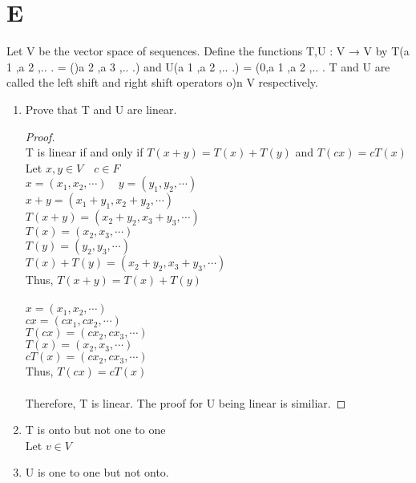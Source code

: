 \documentclass[11pt]{scrartcl}
\begin{document}
\section{E}
Let V be the vector space of sequences. Define the functions T,U : V → V by
T(a 1 ,a 2 ,.. . = ()a 2 ,a 3 ,.. .) and U(a 1 ,a 2 ,.. .) = (0,a 1 ,a 2 ,.. .
T and U are called the left shift and right shift operators o)n V respectively.
\begin{enumerate}[label=\alph*.]
	\item{
		Prove that T and U are linear.
		\begin{proof}
			\-\\
			T is linear if and only if $T(x+y) = T(x) + T(y)$ and $T(cx) = cT(x)$\\	
			Let $x,y \in V \quad c \in F$\\
			$x = (x_1, x_2, \cdots) \quad y = (y_1, y_2, \cdots)$\\
			$x + y = (x_1 + y_1, x_2 + y_2, \cdots)$ \\
			$T(x + y) = (x_2 + y_2, x_3 + y_3, \cdots)$ \\
			$T(x) = (x_2, x_3, \cdots)$\\
			$T(y) = (y_2, y_3, \cdots)$\\
			$T(x) + T(y) = (x_2 + y_2, x_3 + y_3, \cdots)$ \\
			Thus, $T(x + y) = T(x) + T(y)$\\
			\-\\
			$x = (x_1, x_2, \cdots)$\\
			$cx = (cx_1, cx_2, \cdots)$\\
			$T(cx) = (cx_2, cx_3, \cdots)$\\
			$T(x) = (x_2, x_3, \cdots)$\\
			$cT(x) = (cx_2, cx_3, \cdots)$\\
			Thus, $T(cx) = cT(x)$\\
			\-\\
			Therefore, T is linear. The proof for U being linear is similiar.
		\end{proof}
		}
		\item{
			T is onto but not one to one\\
			Let $v \in V$

			}
		\item{
			U is one to one but not onto.
			}
\end{enumerate}
	
\end{document}
